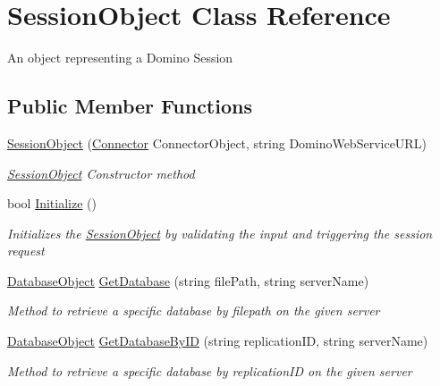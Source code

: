 \hypertarget{class_session_object}{}\section{Session\+Object Class Reference}
\label{class_session_object}


An object representing a Domino Session  


\subsection*{Public Member Functions}
\begin{DoxyCompactItemize}
\item 
\mbox{\hyperlink{class_session_object_a173822a7aec467880195d79a1bc9f520}{Session\+Object}} (\mbox{\hyperlink{class_connector}{Connector}} Connector\+Object, string Domino\+Web\+Service\+U\+RL)
\begin{DoxyCompactList}\small\item\em \mbox{\hyperlink{class_session_object}{Session\+Object}} Constructor method \end{DoxyCompactList}\item 
bool \mbox{\hyperlink{class_session_object_af3b9c9d56d98c848061952ed935f815b}{Initialize}} ()
\begin{DoxyCompactList}\small\item\em Initializes the \mbox{\hyperlink{class_session_object}{Session\+Object}} by validating the input and triggering the session request \end{DoxyCompactList}\item 
\mbox{\hyperlink{class_database_object}{Database\+Object}} \mbox{\hyperlink{class_session_object_aa4871ea2dac4215bef0274a2bd71ae72}{Get\+Database}} (string file\+Path, string server\+Name)
\begin{DoxyCompactList}\small\item\em Method to retrieve a specific database by filepath on the given server \end{DoxyCompactList}\item 
\mbox{\hyperlink{class_database_object}{Database\+Object}} \mbox{\hyperlink{class_session_object_ae53bad1d2fe161060ae409024b3e0de4}{Get\+Database\+By\+ID}} (string replication\+ID, string server\+Name)
\begin{DoxyCompactList}\small\item\em Method to retrieve a specific database by replication\+ID on the given server \end{DoxyCompactList}\end{DoxyCompactItemize}
